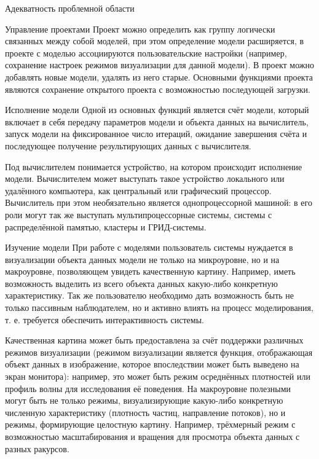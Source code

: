 \documentclass[a4paper,12pt]{extarticle}
\begin{document}
\begin{subsection}{Адекватность проблемной области}
\begin{subsubsection}{Управление проектами}
        Проект можно определить как группу логически связанных между собой моделей, при этом определение модели расширяется, в проекте с моделью ассоциируются пользовательские настройки (например, сохранение настроек режимов визуализации для данной модели). В проект можно добавлять новые модели, удалять из него старые. Основными функциями проекта являются сохранение открытого проекта с возможностью последующей загрузки.
    \end{subsubsection}
        
    \begin{subsubsection}{Исполнение модели} 
        Одной из основных функций является счёт модели, который включает в себя передачу параметров модели и объекта данных на вычислитель, запуск модели на фиксированное число итераций, ожидание завершения счёта и последующее получение результирующих данных с вычислителя.
        
        Под вычислителем понимается устройство, на котором происходит исполнение модели. Вычислителем может выступать такое устройство локального или удалённого компьютера, как центральный или графический процессор. Вычислитель при этом необязательно является однопроцессорной машиной: в его роли могут так же выступать мультипроцессорные системы, системы с распределённой памятью, кластеры и ГРИД-системы.
    \end{subsubsection}
        
    \begin{subsubsection}{Изучение модели}
        При работе с моделями пользователь системы нуждается в  визуализации объекта данных модели не только на микроуровне, но и на макроуровне, позволяющем увидеть качественную картину. Например, иметь возможность выделить из всего объекта данных какую-либо конкретную характеристику. Так же пользователю необходимо дать возможность быть не только пассивным наблюдателем, но и активно влиять на процесс моделирования, т. е. требуется обеспечить интерактивность системы.
        
        Качественная картина может быть предоставлена за счёт поддержки различных режимов визуализации (режимом визуализации является функция, отображающая объект данных в изображение, которое впоследствии может быть выведено на экран монитора): например, это может быть режим осреднённых плотностей или профиль волны для исследования её поведения. На макроуровне полезными могут быть не только режимы, визуализирующие какую-либо конкретную численную характеристику (плотность частиц, направление потоков), но и режимы, формирующие целостную картину. Например, трёхмерный режим с возможностью масштабирования и вращения для просмотра объекта данных с разных ракурсов.
    \end{subsubsection}
        

\end{subsection}
\end{document}
